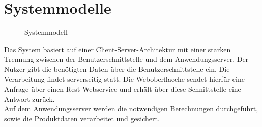 \section{Systemmodelle}
\begin{figure}[!htb]
	\caption{Systemmodell}
	\resizebox{\textwidth}{!} {
		
	}
\end{figure}
Das System basiert auf einer Client-Server-Architektur mit einer starken Trennung zwischen der Benutzerschnittstelle und dem Anwendungsserver. Der Nutzer gibt die benötigten Daten über die Benutzerschnittstelle ein. Die Verarbeitung findet serverseitig statt. Die \gls{Weboberflaeche} sendet hierfür eine Anfrage über einen \gls{Rest}-\gls{Webservice}
 und erhält über diese Schnittstelle eine Antwort zurück. \\
Auf dem Anwendungsserver werden die notwendigen Berechnungen durchgeführt, sowie die Produktdaten verarbeitet und gesichert.